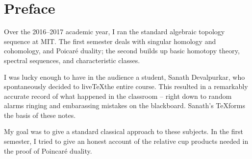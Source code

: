 \cleardoublepage
\section*{Preface}
Over the 2016--2017 academic year, I ran the standard algebraic topology 
sequence at MIT. The first semester deals with singular homology and 
cohomology, and Poicar\'e duality; the second builds up basic homotopy theory,
spectral sequences, and characteristic classes. 

I was lucky enough to have in the audience a student, Sanath Devalpurkar, 
who spontaneously decided to live\TeX the entire course. This resulted in 
a remarkably accurate record of what happened in the classroom -- right down
to random alarms ringing and embarassing mistakes on the blackboard. 
Sanath's \TeX forms the basis of these notes. 

My goal was to give a standard classical approach to these subjects. 
In the first semester, I tried to give an honest account of the relative cup
products needed in the proof of Poincar\'e duality. 


\newpage




